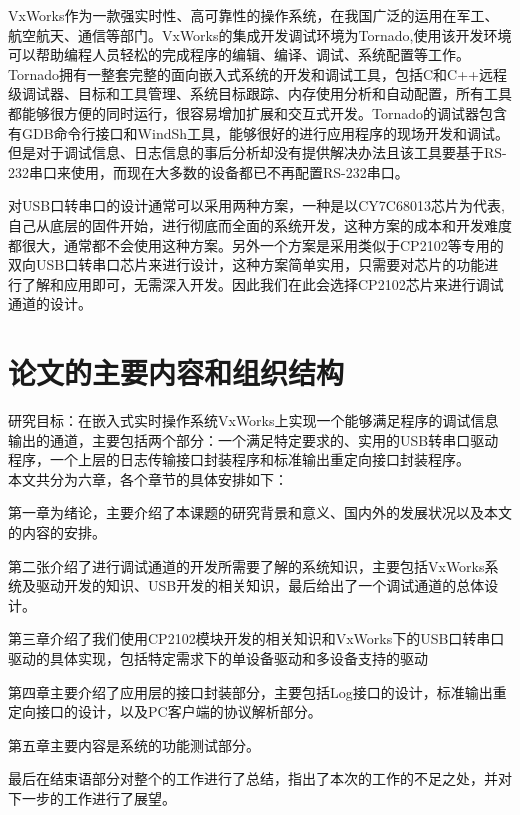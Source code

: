 	VxWorks作为一款强实时性、高可靠性的操作系统，在我国广泛的运用在军工、航空航天、通信等部门\cite{徐媛媛2003嵌入式实时操作系统的设备驱动}。VxWorks的集成开发调试环境为Tornado,使用该开发环境可以帮助编程人员轻松的完成程序的编辑、编译、调试、系统配置等工作\cite{嵌入式实时操作系统VxWorks及其开发环境Tornado}\cite{Tronado}。Tornado拥有一整套完整的面向嵌入式系统的开发和调试工具，包括C和C++远程级调试器、目标和工具管理、系统目标跟踪、内存使用分析和自动配置，所有工具都能够很方便的同时运行，很容易增加扩展和交互式开发\cite{TronadoBSP}。Tornado的调试器包含有GDB命令行接口和WindSh工具，能够很好的进行应用程序的现场开发和调试。但是对于调试信息、日志信息的事后分析却没有提供解决办法且该工具要基于RS-232串口来使用，而现在大多数的设备都已不再配置RS-232串口。
	
	对USB口转串口的设计通常可以采用两种方案，一种是以CY7C68013芯片为代表,自己从底层的固件开始，进行彻底而全面的系统开发，这种方案的成本和开发难度都很大，通常都不会使用这种方案。另外一个方案是采用类似于CP2102等专用的双向USB口转串口芯片来进行设计，这种方案简单实用，只需要对芯片的功能进行了解和应用即可，无需深入开发。因此我们在此会选择CP2102芯片来进行调试通道的设计。
	

\section{论文的主要内容和组织结构}	
	研究目标：在嵌入式实时操作系统VxWorks上实现一个能够满足程序的调试信息输出的通道，主要包括两个部分：一个满足特定要求的、实用的USB转串口驱动程序，一个上层的日志传输接口封装程序和标准输出重定向接口封装程序。\\
 本文共分为六章，各个章节的具体安排如下：
 
 第一章为绪论，主要介绍了本课题的研究背景和意义、国内外的发展状况以及本文的内容的安排。
 
 第二张介绍了进行调试通道的开发所需要了解的系统知识，主要包括VxWorks系统及驱动开发的知识、USB开发的相关知识，最后给出了一个调试通道的总体设计。
 
 第三章介绍了我们使用CP2102模块开发的相关知识和VxWorks下的USB口转串口驱动的具体实现，包括特定需求下的单设备驱动和多设备支持的驱动
 
 第四章主要介绍了应用层的接口封装部分，主要包括Log接口的设计，标准输出重定向接口的设计，以及PC客户端的协议解析部分。
 
 第五章主要内容是系统的功能测试部分。
 
 最后在结束语部分对整个的工作进行了总结，指出了本次的工作的不足之处，并对下一步的工作进行了展望。 

\